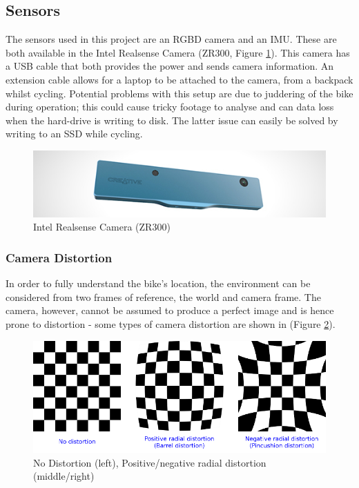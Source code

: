 \documentclass[11pt,twoside]{report}
\begin{document}
\subsection{Sensors}
The sensors used in this project are an RGBD camera and an IMU. These are both available in the Intel Realsense Camera (ZR300, Figure \ref{realsense_camera}). This camera has a USB cable that both provides the power and sends camera information. An extension cable allows for a laptop to be attached to the camera, from a backpack whilst cycling. Potential problems with this setup are due to juddering of the bike during operation; this could cause tricky footage to analyse and can data loss when the hard-drive is writing to disk. The latter issue can easily be solved by writing to an SSD while cycling.

\noindent \begin{figure}[h!]
	\includegraphics[width = 1.0\hsize]{./figures/intel_realsense.jpg}
	\caption{Intel Realsense Camera (ZR300)}
	\label{realsense_camera}
\end{figure}

\subsubsection{Camera Distortion}
In order to fully understand the bike's location, the environment can be considered from two frames of reference, the world and camera frame. The camera, however, cannot be assumed to produce a perfect image and is hence prone to distortion - some types of camera distortion are shown in (Figure \ref{distortion}).


\noindent \begin{figure}[h!]
	\includegraphics[width = 1\hsize]{figures/distortion_example.png} 
	\caption{No Distortion (left)\cite{opencv_camera_article}, Positive/negative radial distortion (middle/right)}
	\label{distortion}
\end{figure}
\end{document}

